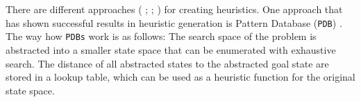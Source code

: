 There are different approaches (\citeauthor{haslum2007domain} \citeyear{haslum2007domain}; \citeauthor{edelkamp2007automated} \citeyear{edelkamp2007automated}; \citeauthor{nissim2011computing} \citeyear{nissim2011computing}) for creating heuristics. %
One approach that has shown successful results in heuristic generation is Pattern Database (\texttt{PDB}) \cite{culberson1998pattern}. The way how \texttt{PDBs} work is as follows: The search space of the problem is abstracted into a smaller state space that can be enumerated with exhaustive search. The distance of all abstracted states to the abstracted goal state are stored in a lookup table, which can be used as a heuristic function for the original state space.


